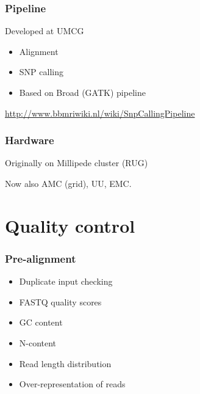\documentclass[slidestop,14pt]{beamer}
\begin{document}
\begin{frame}
  \frametitle{Pipeline}

  \vspace{\baselineskip}

  Developed at UMCG

  \vspace{\baselineskip}

  \begin{itemize}
    \item Alignment
    \item SNP calling
    \item Based on Broad (GATK) pipeline
  \end{itemize}

  \vspace{\baselineskip}

  \url{http://www.bbmriwiki.nl/wiki/SnpCallingPipeline}
\end{frame}

\begin{frame}
  \frametitle{Hardware}

  \vspace{\baselineskip}

  Originally on Millipede cluster (RUG)

  \vspace{\baselineskip}

  Now also AMC (grid), UU, EMC.
\end{frame}

\section{Quality control}


\begin{frame}
  \frametitle{Pre-alignment}

  \vspace{\baselineskip}

  \begin{itemize}
    \item Duplicate input checking
    \item FASTQ quality scores
    \item GC content
    \item N-content
    \item Read length distribution
    \item Over-representation of reads
  \end{itemize}
\end{frame}
\end{document}
